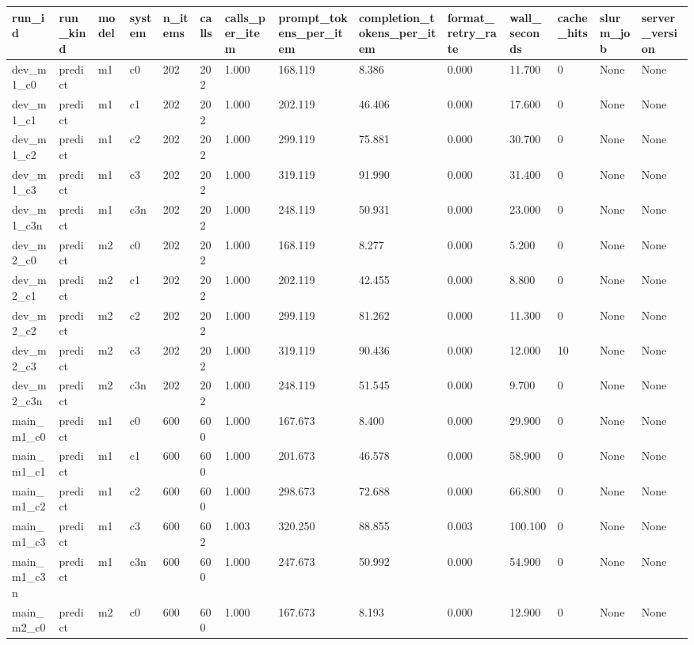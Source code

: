 \begin{tabular}{llllllllllllll}
\toprule
run\_id & run\_kind & model & system & n\_items & calls & calls\_per\_item & prompt\_tokens\_per\_item & completion\_tokens\_per\_item & format\_retry\_rate & wall\_seconds & cache\_hits & slurm\_job & server\_version \\
\midrule
dev\_m1\_c0 & predict & m1 & c0 & 202 & 202 & 1.000 & 168.119 & 8.386 & 0.000 & 11.700 & 0 & None & None \\
dev\_m1\_c1 & predict & m1 & c1 & 202 & 202 & 1.000 & 202.119 & 46.406 & 0.000 & 17.600 & 0 & None & None \\
dev\_m1\_c2 & predict & m1 & c2 & 202 & 202 & 1.000 & 299.119 & 75.881 & 0.000 & 30.700 & 0 & None & None \\
dev\_m1\_c3 & predict & m1 & c3 & 202 & 202 & 1.000 & 319.119 & 91.990 & 0.000 & 31.400 & 0 & None & None \\
dev\_m1\_c3n & predict & m1 & c3n & 202 & 202 & 1.000 & 248.119 & 50.931 & 0.000 & 23.000 & 0 & None & None \\
dev\_m2\_c0 & predict & m2 & c0 & 202 & 202 & 1.000 & 168.119 & 8.277 & 0.000 & 5.200 & 0 & None & None \\
dev\_m2\_c1 & predict & m2 & c1 & 202 & 202 & 1.000 & 202.119 & 42.455 & 0.000 & 8.800 & 0 & None & None \\
dev\_m2\_c2 & predict & m2 & c2 & 202 & 202 & 1.000 & 299.119 & 81.262 & 0.000 & 11.300 & 0 & None & None \\
dev\_m2\_c3 & predict & m2 & c3 & 202 & 202 & 1.000 & 319.119 & 90.436 & 0.000 & 12.000 & 10 & None & None \\
dev\_m2\_c3n & predict & m2 & c3n & 202 & 202 & 1.000 & 248.119 & 51.545 & 0.000 & 9.700 & 0 & None & None \\
main\_m1\_c0 & predict & m1 & c0 & 600 & 600 & 1.000 & 167.673 & 8.400 & 0.000 & 29.900 & 0 & None & None \\
main\_m1\_c1 & predict & m1 & c1 & 600 & 600 & 1.000 & 201.673 & 46.578 & 0.000 & 58.900 & 0 & None & None \\
main\_m1\_c2 & predict & m1 & c2 & 600 & 600 & 1.000 & 298.673 & 72.688 & 0.000 & 66.800 & 0 & None & None \\
main\_m1\_c3 & predict & m1 & c3 & 600 & 602 & 1.003 & 320.250 & 88.855 & 0.003 & 100.100 & 0 & None & None \\
main\_m1\_c3n & predict & m1 & c3n & 600 & 600 & 1.000 & 247.673 & 50.992 & 0.000 & 54.900 & 0 & None & None \\
main\_m2\_c0 & predict & m2 & c0 & 600 & 600 & 1.000 & 167.673 & 8.193 & 0.000 & 12.900 & 0 & None & None \\

\end{tabular}
